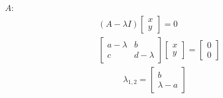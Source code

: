 \documentclass[12pt]{article}
\begin{document}
 $A:$
\begin{equation}
\begin{split}
(A - \lambda I)\begin{bmatrix}x \\ y\end{bmatrix} = 0 \\[6pt]
\begin{bmatrix}
a-\lambda & b \\
c & d-\lambda
\end{bmatrix}
\begin{bmatrix}
x \\ y
\end{bmatrix}
=
\begin{bmatrix}
0 \\ 0
\end{bmatrix}
\end{split}
\end{equation}
\begin{equation}
\begin{split}
\lambda_{1,2}
=
\begin{bmatrix}
b \\
\lambda - a
\end{bmatrix}
\quad
\end{split}
\end{equation}


\newpage
\end{document}
